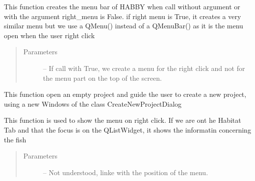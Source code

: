 \documentclass[letterpaper,10pt,english]{sphinxmanual}
\begin{document}
\begin{fulllineitems}
\begin{fulllineitems}
\end{fulllineitems}


\begin{fulllineitems}
\label{\detokenize{index:src_GUI.Main_windows_1.MainWindows.my_menu_bar}}
This function creates the menu bar of HABBY when call without argument or with the argument right\_menu is False.
if right menu is True, it creates a very similar menu but we use a QMenu() instead of a QMenuBar() as it
is the menu open when the user right click
\begin{quote}\begin{description}
\item[{Parameters}] \leavevmode
{} -- If call with True, we create a menu for the right click and not for the menu part on the top
of the screen.

\end{description}\end{quote}

\end{fulllineitems}


\begin{fulllineitems}
\label{\detokenize{index:src_GUI.Main_windows_1.MainWindows.my_toolbar}}
\end{fulllineitems}


\begin{fulllineitems}
\label{\detokenize{index:src_GUI.Main_windows_1.MainWindows.new_project}}
This function open an empty project and guide the user to create a new project, using a new Windows
of the class CreateNewProjectDialog

\end{fulllineitems}


\begin{fulllineitems}
\label{\detokenize{index:src_GUI.Main_windows_1.MainWindows.on_context_menu}}
This function is used to show the menu on right click. If we are ont he Habitat Tab and that the focus is on
the QListWidget, it shows the informatin concerning the fish
\begin{quote}\begin{description}
\item[{Parameters}] \leavevmode
{} -- Not understood, linke with the position of the menu.


\end{description}
\end{quote}
\end{fulllineitems}
\end{fulllineitems}
\end{document}
